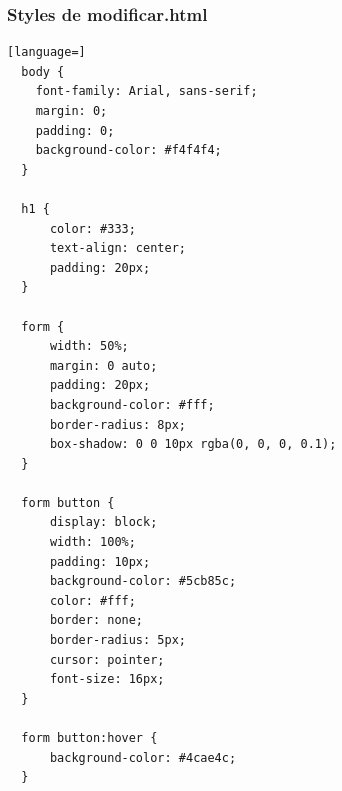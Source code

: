 \documentclass{article}
\begin{document}

  \subsubsection{Styles de modificar.html}
  \begin{lstlisting}[language=]
  body {
    font-family: Arial, sans-serif;
    margin: 0;
    padding: 0;
    background-color: #f4f4f4;
  }

  h1 {
      color: #333;
      text-align: center;
      padding: 20px;
  }

  form {
      width: 50%;
      margin: 0 auto;
      padding: 20px;
      background-color: #fff;
      border-radius: 8px;
      box-shadow: 0 0 10px rgba(0, 0, 0, 0.1);
  }

  form button {
      display: block;
      width: 100%;
      padding: 10px;
      background-color: #5cb85c;
      color: #fff;
      border: none;
      border-radius: 5px;
      cursor: pointer;
      font-size: 16px;
  }

  form button:hover {
      background-color: #4cae4c;
  }

  \end{lstlisting}
  
\end{document}
